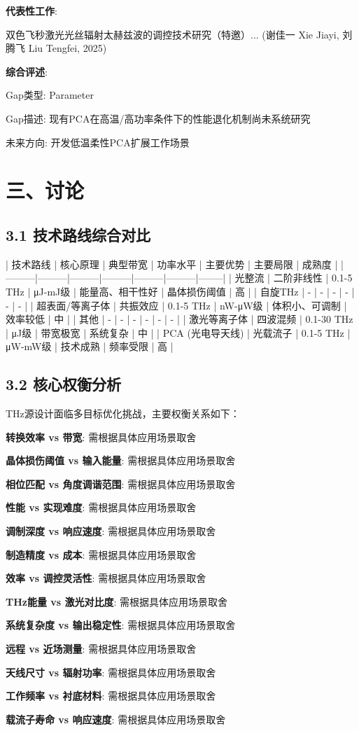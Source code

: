 \documentclass[12pt]{article}
\begin{document}
\textbf{代表性工作}:
\item [1] 双色飞秒激光光丝辐射太赫兹波的调控技术研究（特邀）... (谢佳一 Xie Jiayi, 刘腾飞 Liu Tengfei, 2025)

\textbf{综合评述}:
\item Gap类型: Parameter
\item Gap描述: 现有PCA在高温/高功率条件下的性能退化机制尚未系统研究
\item 未来方向: 开发低温柔性PCA扩展工作场景


\section{三、讨论}


\subsection{3.1 技术路线综合对比}

| 技术路线 | 核心原理 | 典型带宽 | 功率水平 | 主要优势 | 主要局限 | 成熟度 |
|---------|---------|---------|---------|---------|---------|--------|
| 光整流 | 二阶非线性 | 0.1-5 THz | μJ-mJ级 | 能量高、相干性好 | 晶体损伤阈值 | 高 |
| 自旋THz | - | - | - | - | - | - |
| 超表面/等离子体 | 共振效应 | 0.1-5 THz | nW-μW级 | 体积小、可调制 | 效率较低 | 中 |
| 其他 | - | - | - | - | - | - |
| 激光等离子体 | 四波混频 | 0.1-30 THz | μJ级 | 带宽极宽 | 系统复杂 | 中 |
| PCA (光电导天线) | 光载流子 | 0.1-5 THz | μW-mW级 | 技术成熟 | 频率受限 | 高 |


\subsection{3.2 核心权衡分析}

THz源设计面临多目标优化挑战，主要权衡关系如下：
\item \textbf{转换效率 vs 带宽}: 需根据具体应用场景取舍
\item \textbf{晶体损伤阈值 vs 输入能量}: 需根据具体应用场景取舍
\item \textbf{相位匹配 vs 角度调谐范围}: 需根据具体应用场景取舍
\item \textbf{性能 vs 实现难度}: 需根据具体应用场景取舍
\item \textbf{调制深度 vs 响应速度}: 需根据具体应用场景取舍
\item \textbf{制造精度 vs 成本}: 需根据具体应用场景取舍
\item \textbf{效率 vs 调控灵活性}: 需根据具体应用场景取舍
\item \textbf{THz能量 vs 激光对比度}: 需根据具体应用场景取舍
\item \textbf{系统复杂度 vs 输出稳定性}: 需根据具体应用场景取舍
\item \textbf{远程 vs 近场测量}: 需根据具体应用场景取舍
\item \textbf{天线尺寸 vs 辐射功率}: 需根据具体应用场景取舍
\item \textbf{工作频率 vs 衬底材料}: 需根据具体应用场景取舍
\item \textbf{载流子寿命 vs 响应速度}: 需根据具体应用场景取舍
\end{document}
